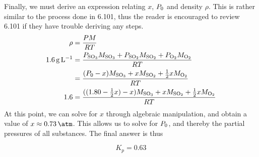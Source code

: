 \documentclass[11 pt]{article}
\newcommand{\p}[1]{
  P_{\ce{#1}}
}
\newcommand{\m}[1]{
  M_{\ce{#1}}
}
\begin{document}
  Finally, we must derive an expression relating $x$, $\p{0}$ and density $\rho$. This is rather similar to the process done in 6.101, thus the reader is encouraged to review 6.101 if they have trouble deriving any steps.
  \begin{align*}
    \rho &= \frac{PM}{RT} \\
     \SI{1.6}{\gram\per\liter}   &= \frac{\p{SO3}\m{SO3} + \p{SO2}\m{SO2} + \p{O2}\m{O2}}{RT} \\
     &= \frac{(\p{0} - x)\m{SO3} + x\m{SO2} + \frac{1}{2}x\m{O2}}{RT} \\
     1.6 &= \frac{((1.80 - \frac{1}{2}x) - x)\m{SO3} + x\m{SO2} + \frac{1}{2}x\m{O2}}{RT}
  \end{align*}
  At this point, we can solve for $x$ through algebraic manipulation, and obtain a value of $x \approx  \SI{0.73}{\atm}$. This allows us to solve for $\p{0}$, and thereby the partial pressures of all substances. The final answer is thus 
  \begin{answerBox}
    $$K_p = 0.63$$ 
  \end{answerBox}
  
\end{document}
